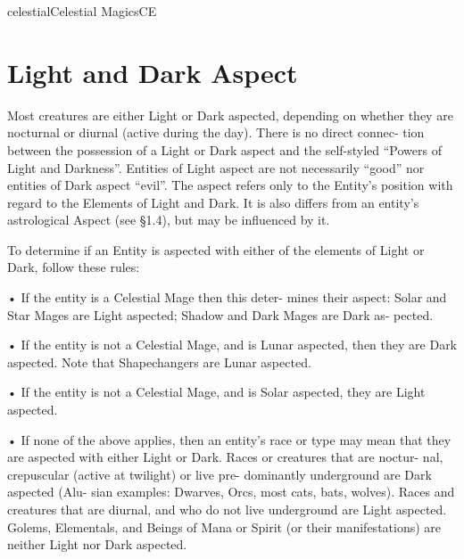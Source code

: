 \begin{College}[1.3]{celestial}{Celestial Magics}{CE}
\section{Light and Dark Aspect}

Most  creatures  are  either  Light  or  Dark  aspected, 
depending on whether they are nocturnal or diurnal 
(active during the day). There is no direct connec-
tion  between  the  possession  of  a  Light  or  Dark 
aspect  and  the  self-styled  “Powers  of  Light  and 
Darkness”.  Entities  of  Light  aspect  are  not  necessarily  “good”  nor  entities  of  Dark  aspect  “evil”. 
The aspect refers only to the Entity’s position with 
regard to the Elements of Light and Dark. It is also 
differs  from  an  entity’s  astrological  Aspect  (see 
§1.4), but may be influenced by it. 

To determine if an Entity is aspected with either of 
the elements of Light or Dark, follow these rules:  

•  If  the  entity  is  a  Celestial  Mage  then  this  deter-
mines their aspect: Solar and Star Mages are Light 
aspected;  Shadow  and  Dark  Mages  are  Dark  as-
pected.  

• If the entity is not a Celestial Mage, and is Lunar 
aspected,  then  they  are  Dark  aspected.  Note  that 
Shapechangers are Lunar aspected.  

• If the entity is not a Celestial Mage, and is Solar 
aspected, they are Light aspected.  

• If none of the above applies, then an entity’s race 
or type may mean that they are aspected with either 
Light  or  Dark.  Races  or  creatures  that  are  noctur-
nal,  crepuscular  (active  at  twilight)  or  live  pre-
dominantly  underground  are  Dark  aspected  (Alu-
sian  examples:  Dwarves,  Orcs,  most  cats,  bats, 
wolves).  Races  and  creatures  that  are  diurnal,  and 
who  do  not  live  underground  are  Light  aspected. 
Golems, Elementals, and Beings of Mana or Spirit 
(or their manifestations) are neither Light nor Dark 
aspected. 
\end{College}

